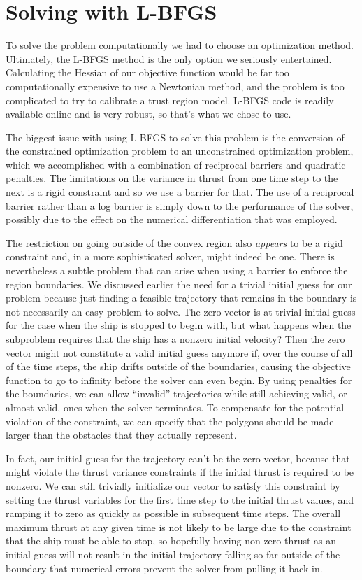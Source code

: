 \documentclass{report}
\begin{document}
\section{Solving with L-BFGS}
To solve the problem computationally we had to choose an optimization method. Ultimately, the L-BFGS method is
the only option we seriously entertained. Calculating the Hessian of our objective function would be far too 
computationally expensive to use a Newtonian method, and the problem is too complicated to try to calibrate a
trust region model. L-BFGS code is readily available online and is very robust, so that's what we chose to use.

The biggest issue with using L-BFGS to solve this problem is the conversion of the constrained optimization problem
to an unconstrained optimization problem, which we accomplished with a combination of reciprocal barriers
and quadratic penalties. The limitations on the variance in thrust from one time step to the next is a rigid constraint
and so we use a barrier for that. The use of a reciprocal barrier rather than a log barrier is simply down to the
performance of the solver, possibly due to the effect on the numerical differentiation that was employed.

The restriction on going outside of the convex region also \emph{appears} to be a rigid constraint and, in a more
sophisticated solver, might indeed be one. There is nevertheless a subtle problem that can arise when using a barrier
to enforce the region boundaries. We discussed earlier the need for a trivial initial guess for our problem because
just finding a feasible trajectory that remains in the boundary is not necessarily an easy problem to solve. The
zero vector is at trivial initial guess for the case when the ship is stopped to begin with, but what happens when
the subproblem requires that the ship has a nonzero initial velocity? Then the zero vector might not constitute a 
valid initial guess anymore if, over the course of all of the time steps, the ship drifts outside of the boundaries,
causing the objective function to go to infinity before the solver can even begin. By using penalties for the boundaries,
we can allow ``invalid'' trajectories while still achieving valid, or almost valid, ones when the solver terminates.
To compensate for the potential violation of the constraint, we can specify that the polygons should be made larger
than the obstacles that they actually represent.

In fact, our initial guess for the trajectory can't be the zero vector, because that might violate the thrust variance
constraints if the initial thrust is required to be nonzero. We can still trivially initialize our vector to 
satisfy this constraint by setting the thrust variables for the first time step to the initial thrust values, and ramping it
to zero as quickly as possible in subsequent time steps.
The overall maximum thrust at any given time is not likely to be large due
to the constraint that the ship must be able to stop,
so hopefully having non-zero thrust as an initial guess will not result in the initial trajectory falling so far
outside of the boundary that numerical errors prevent the solver from pulling it back in.
\end{document}
